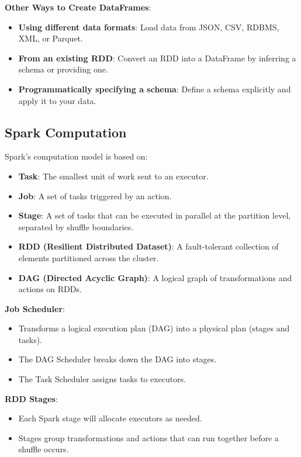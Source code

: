 \documentclass[12pt]{article}
\begin{document}
\noindent\textbf{Other Ways to Create DataFrames}:
\begin{itemize}
    \item \textbf{Using different data formats}: Load data from JSON, CSV, RDBMS, XML, or Parquet.
    \item \textbf{From an existing RDD}: Convert an RDD into a DataFrame by inferring a schema or providing one.
    \item \textbf{Programmatically specifying a schema}: Define a schema explicitly and apply it to your data.
\end{itemize}


\subsection{Spark Computation}
Spark’s computation model is based on:
\begin{itemize}
    \item \textbf{Task}: The smallest unit of work sent to an executor.
    \item \textbf{Job}: A set of tasks triggered by an action.
    \item \textbf{Stage}: A set of tasks that can be executed in parallel at the partition level, separated by shuffle boundaries.
    \item \textbf{RDD (Resilient Distributed Dataset)}: A fault-tolerant collection of elements partitioned across the cluster.
    \item \textbf{DAG (Directed Acyclic Graph)}: A logical graph of transformations and actions on RDDs.
\end{itemize}

\noindent\textbf{Job Scheduler}:
\begin{itemize}
    \item Transforms a logical execution plan (DAG) into a physical plan (stages and tasks).
    \item The DAG Scheduler breaks down the DAG into stages.
    \item The Task Scheduler assigns tasks to executors.
\end{itemize}

\noindent\textbf{RDD Stages}:
\begin{itemize}
    \item Each Spark stage will allocate executors as needed.
    \item Stages group transformations and actions that can run together before a shuffle occurs.
\end{itemize}
\end{document}
